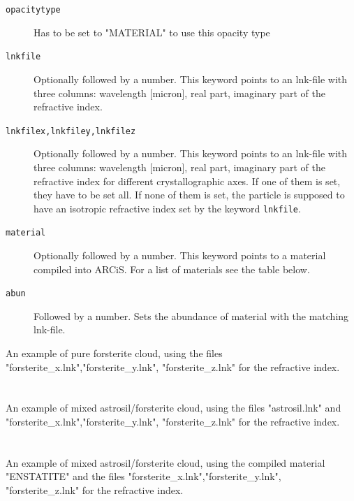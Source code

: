 \documentclass[12pt]{article}
\begin{document}
\begin{description}
\item[\texttt{opacitytype}]
Has to be set to "MATERIAL" to use this opacity type
\item[\texttt{lnkfile}]
Optionally followed by a number. This keyword points to an lnk-file with three columns: wavelength [micron], real part, imaginary part of the refractive index.
\item[\texttt{lnkfilex,lnkfiley,lnkfilez}]
Optionally followed by a number. This keyword points to an lnk-file with three columns: wavelength [micron], real part, imaginary part of the refractive index for different crystallographic axes. If one of them is set, they have to be set all. If none of them is set, the particle is supposed to have an isotropic refractive index set by the keyword \texttt{lnkfile}.
\item[\texttt{material}]
Optionally followed by a number. This keyword points to a material compiled into ARCiS. For a list of materials see the table below.
\item[\texttt{abun}]
Followed by a number. Sets the abundance of material with the matching lnk-file.
\end{description}

An example of pure forsterite cloud, using the files "forsterite\_x.lnk","forsterite\_y.lnk", "forsterite\_z.lnk" for the refractive index.
\\
\\
\\
An example of mixed astrosil/forsterite cloud, using the files "astrosil.lnk" and "forsterite\_x.lnk","forsterite\_y.lnk", "forsterite\_z.lnk" for the refractive index.
\\
\\
\\
An example of mixed astrosil/forsterite cloud, using the compiled material "ENSTATITE" and the files "forsterite\_x.lnk","forsterite\_y.lnk", "forsterite\_z.lnk" for the refractive index.
\\
\\
\\
\end{document}

